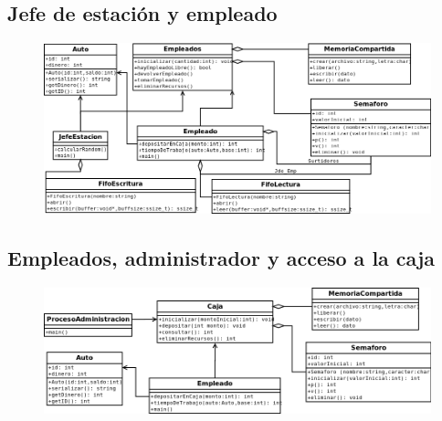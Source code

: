 \documentclass[12pt,a4paper,spanish]{article}
\begin{document}
	\newpage		
	\subsection{Jefe de estación y empleado}
	\begin{figure}[h]
	\includegraphics[scale=0.50, angle=90]{JDE_Empleado.png}
	\centering
	\end{figure}

	\newpage	
	\subsection{Empleados, administrador y acceso a la caja}
	\begin{figure}[h]
	\includegraphics[scale=0.50, angle=90]{AccesoCaja.png}
	\centering
	\end{figure}
\end{document}
